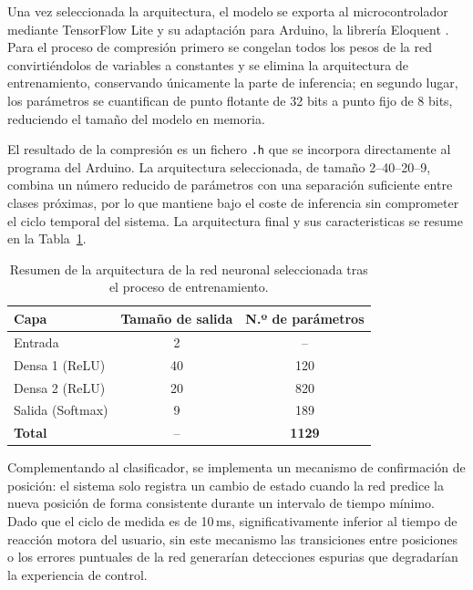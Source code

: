 \documentclass[12pt]{article}
\begin{document}
Una vez seleccionada la arquitectura, el modelo se exporta al microcontrolador mediante TensorFlow Lite \cite{TFLite} y su adaptación para Arduino, la librería Eloquent \cite{Eloquent}. Para el proceso de compresión primero se congelan todos los pesos de la red convirtiéndolos de variables a constantes y se elimina la arquitectura de entrenamiento, conservando únicamente la parte de inferencia; en segundo lugar, los parámetros se cuantifican de punto flotante de 32 bits a punto fijo de 8 bits, reduciendo el tamaño del modelo en memoria.

El resultado de la compresión es un fichero \texttt{.h} que se incorpora directamente al programa del Arduino. La arquitectura seleccionada, de tamaño 2--40--20--9, combina un número reducido de parámetros con una separación suficiente entre clases próximas, por lo que mantiene bajo el coste de inferencia sin comprometer el ciclo temporal del sistema. La arquitectura final y sus caracteristicas se resume en la Tabla~\ref{tab:arquitectura_red}.

\begin{table}[htbp]
\centering
\caption[Arquitectura final de la red neuronal]{Resumen de la arquitectura
de la red neuronal seleccionada tras el proceso de entrenamiento.}
\label{tab:arquitectura_red}

\begin{tabular}{lcc}
\hline
\textbf{Capa} & \textbf{Tamaño de salida} & \textbf{N.º de parámetros} \\
\hline
Entrada & 2 & -- \\
Densa 1 (ReLU) & 40 & 120 \\
Densa 2 (ReLU) & 20 & 820 \\
Salida (Softmax) & 9 & 189 \\
\hline
\textbf{Total} & -- & \textbf{1129} \\
\hline
\end{tabular}
\end{table}

Complementando al clasificador, se implementa un mecanismo de confirmación de posición: el sistema solo registra un cambio de estado cuando la red predice la nueva posición de forma consistente durante un intervalo de tiempo mínimo. Dado que el ciclo de medida es de 10\,ms, significativamente inferior al tiempo de reacción motora del usuario, sin este mecanismo las transiciones entre posiciones o los errores puntuales de la red generarían detecciones espurias que degradarían la experiencia de control.
\end{document}
